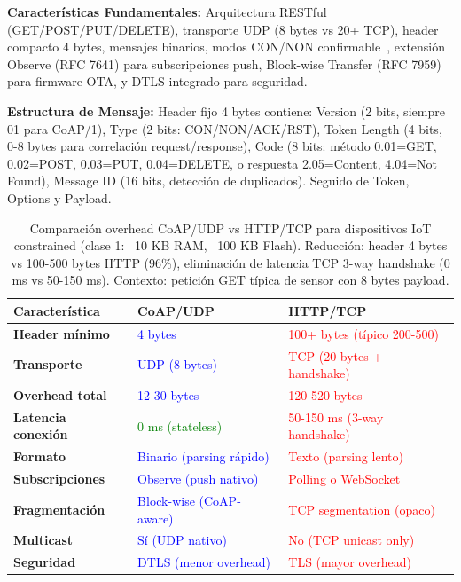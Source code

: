 \textbf{Características Fundamentales:} Arquitectura RESTful (GET/POST/PUT/DELETE), transporte UDP (8 bytes vs 20+ TCP), header compacto 4 bytes, mensajes binarios, modos CON/NON confirmable~\cite{karimiIIoTCommunicationProtocols2025}, extensión Observe (RFC 7641) para subscripciones push, Block-wise Transfer (RFC 7959) para firmware OTA, y DTLS integrado para seguridad.

\textbf{Estructura de Mensaje:} Header fijo 4 bytes contiene: Version (2 bits, siempre 01 para CoAP/1), Type (2 bits: CON/NON/ACK/RST), Token Length (4 bits, 0-8 bytes para correlación request/response), Code (8 bits: método 0.01=GET, 0.02=POST, 0.03=PUT, 0.04=DELETE, o respuesta 2.05=Content, 4.04=Not Found), Message ID (16 bits, detección de duplicados). Seguido de Token, Options y Payload.

\begin{table}[h]
\centering
\small
\caption{Comparación overhead CoAP/UDP vs HTTP/TCP para dispositivos IoT constrained (clase 1: ~10 KB RAM, ~100 KB Flash). Reducción: header 4 bytes vs 100-500 bytes HTTP (96\%), eliminación de latencia TCP 3-way handshake (0 ms vs 50-150 ms). Contexto: petición GET típica de sensor con 8 bytes payload.}
\label{tab:coap-vs-http}
\begin{tabular}{|p{3.5cm}|p{4cm}|p{4cm}|}
\hline
\rowcolor{gray!20}
\textbf{Característica} & \textbf{CoAP/UDP} & \textbf{HTTP/TCP} \\
\hline
\textbf{Header mínimo} & \textcolor{blue}{4 bytes} & \textcolor{red}{100+ bytes (típico 200-500)} \\
\hline
\textbf{Transporte} & \textcolor{blue}{UDP (8 bytes)} & \textcolor{red}{TCP (20 bytes + handshake)} \\
\hline
\textbf{Overhead total} & \textcolor{blue}{12-30 bytes} & \textcolor{red}{120-520 bytes} \\
\hline
\textbf{Latencia conexión} & \textcolor{green}{0 ms (stateless)} & \textcolor{red}{50-150 ms (3-way handshake)} \\
\hline
\textbf{Formato} & \textcolor{blue}{Binario (parsing rápido)} & \textcolor{red}{Texto (parsing lento)} \\
\hline
\textbf{Subscripciones} & \textcolor{blue}{Observe (push nativo)} & \textcolor{red}{Polling o WebSocket} \\
\hline
\textbf{Fragmentación} & \textcolor{blue}{Block-wise (CoAP-aware)} & \textcolor{red}{TCP segmentation (opaco)} \\
\hline
\textbf{Multicast} & \textcolor{blue}{Sí (UDP nativo)} & \textcolor{red}{No (TCP unicast only)} \\
\hline
\textbf{Seguridad} & \textcolor{blue}{DTLS (menor overhead)} & \textcolor{red}{TLS (mayor overhead)} \\
\hline
\end{tabular}
\end{table}

